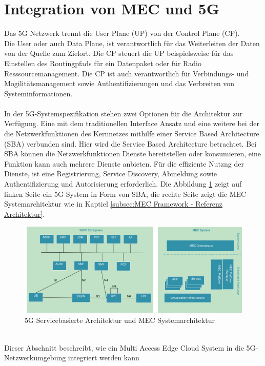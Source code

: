 \documentclass[runningheads]{llncs}
\numberwithin{figure}{section}
\begin{document}
\section{Integration von MEC und 5G}
Das 5G Netzwerk trennt die User Plane (UP) von der Control Plane (CP).  \cite{arnold5GRadioAccess2017} \\
Die User oder auch Data Plane, ist verantwortlich für das Weiterleiten der Daten von der Quelle zum Zielort.
Die CP steuert die UP beispielsweise für das Einstellen des Routingpfads für ein Datenpaket oder für Radio Resssourcemanagement.
Die CP ist auch verantwortlich für Verbindungs- und Mogilitätsmanagement sowie Authentifizierungen und das Verbreiten von 
Systeminformationen. 
\\
\\
In der 5G-Systemspezifikation stehen zwei Optionen für die Architektur zur Verfügung. 
Eine mit dem traditionellen Interface Ansatz und eine weitere 
bei der die Netzwerkfunktionen des Kernnetzes mithilfe einer Service Based Architecture (SBA) verbunden sind. 
Hier wird die Service Based Architecture betrachtet. Bei SBA können die Netzwerkfunktionen Dienste bereitstellen oder konsumieren, eine
Funktion kann auch mehrere Dienste anbieten. 
Für die effiziente Nutzng der Dienste, ist eine Registrierung, Service Discovery, Abmeldung sowie Authentifizierung und Autorisierung erforderlich.
Die Abbildung \ref{fig:sba} zeigt auf linken Seite ein 5G System in Form von SBA, 
die rechte Seite zeigt die MEC-Systemarchitektur wie in Kaptiel \ref{subsec:MEC Framework - Referenz Architektur}.
\begin{figure}
  \includegraphics[width=\linewidth]{images/5GMEC-System-Architecture.png}
  \caption{5G Servicebasierte Architektur und MEC Systemarchitektur \cite{arnold5GRadioAccess2017} \cite{etsiETSIGSMEC}}
  \label{fig:sba}
\end{figure}
\\
Dieser Abschnitt beschreibt, wie ein Multi Access Edge Cloud System in die 5G-Netzwerkumgebung integriert werden kann 
\end{document}
